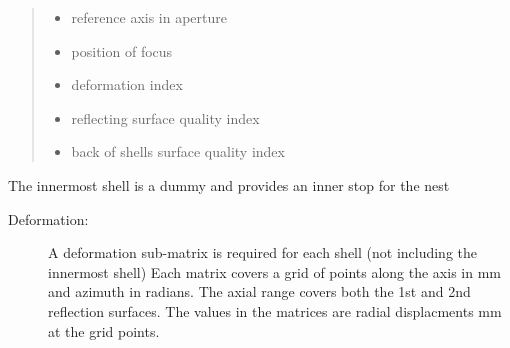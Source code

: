 \documentclass[letterpaper,10pt,english]{sphinxmanual}
\begin{document}
\begin{fulllineitems}
\begin{quote}
\begin{description}
\begin{itemize}
\item {} 
 \textendash{} reference axis in aperture

\item {} 
 \textendash{} position of focus

\item {} 
 \textendash{} deformation index

\item {} 
 \textendash{} reflecting surface quality index

\item {} 
 \textendash{} back of shells surface quality index

\end{itemize}

\end{description}\end{quote}

The innermost shell is a dummy and provides an inner stop for the nest
\begin{description}
\item[{Deformation:}] \leavevmode
A deformation sub-matrix is required for each shell (not
including the innermost shell)
Each matrix covers a grid of points along the axis in mm and azimuth
in radians. The axial range covers both the 1st and 2nd reflection
surfaces.
The values in the matrices are radial displacments mm at the grid
points.

\end{description}

\end{fulllineitems}

\end{document}
